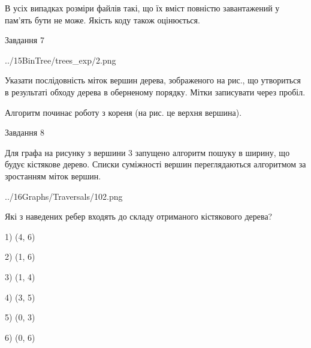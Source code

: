 \documentclass[12pt, ukrainian]{article}
\begin{document}
{В усіх випадках розміри файлів такі, що їх вміст повністю завантажений у пам'ять бути не може. Якість коду також оцінюється.



\vspace{10mm}\par

\newpage
\begin{minipage}[t]{9.7cm}
               
{\begin{center}Завдання {7}\end{center}}
\vspace{-4mm}

\begin{center}
	{../15BinTree/trees_exp/2.png}
\end{center}
Указати послідовність міток вершин дерева, зображеного на рис., що утвориться в результаті обходу дерева в оберненому порядку. Мітки записувати через пробіл.\par Алгоритм починає роботу з кореня (на рис. це верхня вершина).\par

\end{minipage}
\vline \hspace{8mm}
\begin{minipage}[t]{8.0cm}
               
{\begin{center}Завдання {8}\end{center}}
\vspace{-4mm}
Для графа на рисунку з вершини 3 запущено алгоритм пошуку в ширину, що будує кістякове дерево. Списки суміжності вершин переглядаються алгоритмом за зростанням міток вершин.\par
\begin{center}
	{../16Graphs/Traversals/102.png}
\end{center}
\par Які з наведених ребер входять до складу отриманого кістякового дерева?\par
1) (4, 6)\par
2) (1, 6)\par
3) (1, 4)\par
4) (3, 5)\par
5) (0, 3)\par
6) (0, 6)\par
{\vskip 15pt} \par


\end{minipage}}
\end{document}
